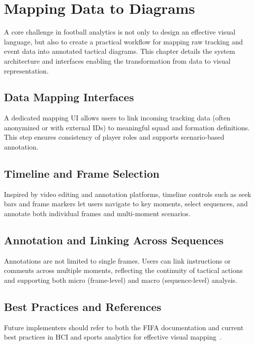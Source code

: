 \documentclass[11pt,a4paper,openright]{report}
\begin{document}
\chapter{Mapping Data to Diagrams}
\label{chap:data_to_diagram_mapping}

A core challenge in football analytics is not only to design an effective visual language, but also to create a practical workflow for mapping raw tracking and event data into annotated tactical diagrams. This chapter details the system architecture and interfaces enabling the transformation from data to visual representation.

\section{Data Mapping Interfaces}

A dedicated mapping UI allows users to link incoming tracking data (often anonymized or with external IDs) to meaningful squad and formation definitions. This step ensures consistency of player roles and supports scenario-based annotation.

\section{Timeline and Frame Selection}

Inspired by video editing and annotation platforms, timeline controls such as seek bars and frame markers let users navigate to key moments, select sequences, and annotate both individual frames and multi-moment scenarios.

\section{Annotation and Linking Across Sequences}

Annotations are not limited to single frames. Users can link instructions or comments across multiple moments, reflecting the continuity of tactical actions and supporting both micro (frame-level) and macro (sequence-level) analysis.

\section{Best Practices and References}

Future implementers should refer to both the FIFA documentation and current best practices in HCI and sports analytics for effective visual mapping~\cite{maiden2023designing, perin2013soccerstories, sacha2014feature}.
\end{document}
